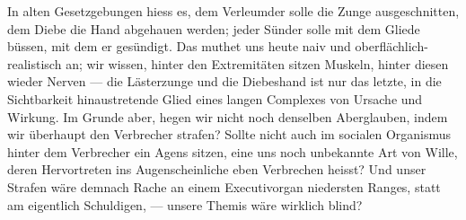 In alten Gesetzgebungen hiess es, dem Verleumder solle die Zunge ausgeschnitten, dem Diebe die Hand abgehauen werden; jeder Sünder solle mit dem Gliede büssen, mit dem er gesündigt. Das muthet uns heute naiv und oberflächlich-realistisch an; wir wissen, hinter den Extremitäten sitzen Muskeln, hinter diesen wieder Nerven — die Lästerzunge und die Diebeshand ist nur das letzte, in die Sichtbarkeit hinaustretende Glied eines langen Complexes von Ursache und Wirkung. Im Grunde aber, hegen wir nicht noch denselben Aberglauben, indem wir überhaupt den Verbrecher strafen? Sollte nicht auch im socialen Organismus hinter dem Verbrecher ein Agens sitzen, eine uns noch unbekannte Art von Wille, deren Hervortreten ins Augenscheinliche eben Verbrechen heisst? Und unser Strafen wäre demnach Rache an einem Executivorgan niedersten Ranges, statt am eigentlich Schuldigen, — unsere Themis wäre wirklich blind?
\par

